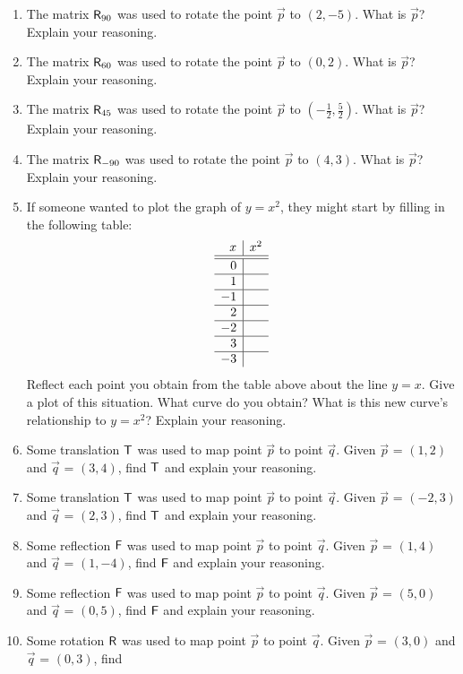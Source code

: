 \begin{enumerate}
\item The matrix $\mathsf{R}_{90}$ was used to rotate the point $\vec{p}$
  to $(2,-5)$.  What is $\vec{p}$? Explain your reasoning.
\item The matrix $\mathsf{R}_{60}$ was used to rotate the point $\vec{p}$
  to $(0,2)$.  What is $\vec{p}$? Explain your reasoning.
\item The matrix $\mathsf{R}_{45}$ was used to rotate the point $\vec{p}$
  to $(-\frac{1}{2}, \frac{5}{2})$.  What is $\vec{p}$? Explain your reasoning.
\item The matrix $\mathsf{R}_{-90}$ was used to rotate the point $\vec{p}$
  to $(4,3)$.  What is $\vec{p}$? Explain your reasoning.
\item If someone wanted to plot the graph of $y=x^2$, they might start
  by filling in the following table:
\[
\begin{array}{r | c}
 x & x^2 \\
\hline\hline
0  & \\\hline
1  & \\\hline
-1 & \\\hline
2  & \\\hline
-2 & \\\hline
3  & \\\hline
-3 & 
\end{array}
\]
Reflect each point you obtain from the table above about the line
$y=x$. Give a plot of this situation. What curve do you obtain? What
is this new curve's relationship to $y=x^2$? Explain your reasoning.
\item Some translation $\mathsf{T}$ was used to map point $\vec{p}$ to
  point $\vec{q}$.  Given $\vec{p}$ = $(1,2)$ and $\vec{q}$ = $(3,4)$,
  find $\mathsf{T}$ and explain your reasoning.
\item Some translation $\mathsf{T}$ was used to map point $\vec{p}$ to
  point $\vec{q}$.  Given $\vec{p}$ = $(-2,3)$ and $\vec{q}$ =
  $(2,3)$, find $\mathsf{T}$ and explain your reasoning.
\item Some reflection $\mathsf{F}$ was used to map point $\vec{p}$ to
  point $\vec{q}$.  Given $\vec{p}$ = $(1,4)$ and $\vec{q}$ =
  $(1,-4)$, find $\mathsf{F}$ and explain your reasoning.
\item Some reflection $\mathsf{F}$ was used to map point $\vec{p}$ to
  point $\vec{q}$.  Given $\vec{p}$ = $(5,0)$ and $\vec{q}$ = $(0,5)$,
  find $\mathsf{F}$ and explain your reasoning.
\item Some rotation $\mathsf{R}$ was used to map point $\vec{p}$ to point
  $\vec{q}$.  Given $\vec{p}$ = $(3,0)$ and $\vec{q}$ = $(0,3)$, find

\end{enumerate}
